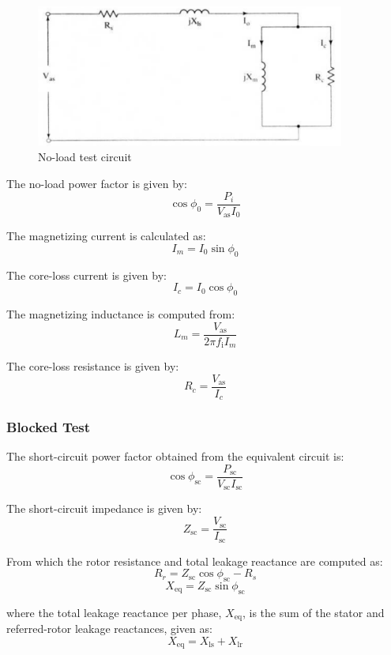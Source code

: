 
\begin{figure}[H]
    \centering
    \includegraphics[width=4in]{sections/section5/images/ParamEstim/noloadCircuitKrish.png}
    \caption{No-load test circuit}
    \label{fig:no_load_test}
\end{figure}

The no-load power factor is given by:
$$\cos \phi_0 = \frac{P_i}{V_\text{as}I_0}$$

The magnetizing current is calculated as:
$$I_m = I_0 \sin \phi_0$$

The core-loss current is given by:
$$I_c = I_0 \cos \phi_0$$

The magnetizing inductance is computed from:
$$L_m = \frac{V_\text{as}}{2\pi f_\text{i}I_m}$$

The core-loss resistance is given by:
$$R_c = \frac{V_\text{as}}{I_c}$$


\subsubsection{Blocked Test}



The short-circuit power factor obtained from the equivalent circuit is:
$$\cos \phi_\text{sc} = \frac{P_\text{sc}}{V_\text{sc}I_\text{sc}}$$

The short-circuit impedance is given by:
$$Z_\text{sc} = \frac{V_\text{sc}}{I_\text{sc}}$$

From which the rotor resistance and total leakage reactance are computed as:
$$R_r = Z_\text{sc} \cos \phi_\text{sc} - R_s$$
$$X_\text{eq} = Z_\text{sc} \sin \phi_\text{sc}$$

where the total leakage reactance per phase, $X_\text{eq}$, is the sum of the stator and referred-rotor leakage reactances, given as:
$$X_\text{eq} = X_\text{ls} + X_\text{lr}$$


\newpage